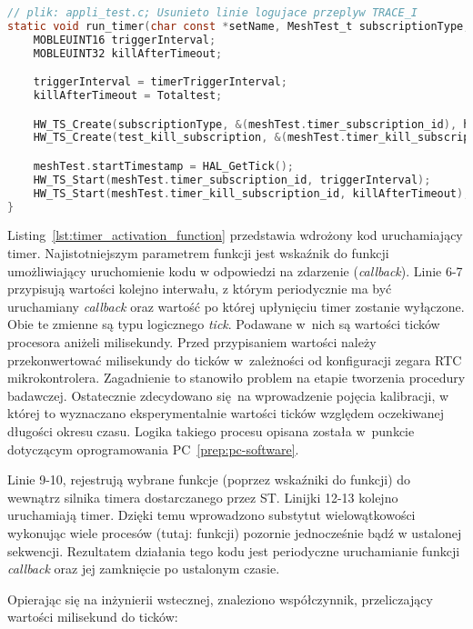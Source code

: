 \begin{lstlisting}[language=C,
    caption={Funkcja aktywująca timer},
    label={lst:timer_activation_function}]
// plik: appli_test.c; Usunieto linie logujace przeplyw TRACE_I
static void run_timer(char const *setName, MeshTest_t subscriptionType, MOBLE_ADDRESS src ,MOBLE_ADDRESS dst, void (*callback)(void) ) {
	MOBLEUINT16 triggerInterval;
	MOBLEUINT32 killAfterTimeout;

	triggerInterval = timerTriggerInterval;
	killAfterTimeout = Totaltest;

	HW_TS_Create(subscriptionType, &(meshTest.timer_subscription_id), hw_ts_Repeated, callback);
	HW_TS_Create(test_kill_subscription, &(meshTest.timer_kill_subscription_id), hw_ts_SingleShot, kill_subscription);

	meshTest.startTimestamp = HAL_GetTick();
	HW_TS_Start(meshTest.timer_subscription_id, triggerInterval);
	HW_TS_Start(meshTest.timer_kill_subscription_id, killAfterTimeout);
}
\end{lstlisting}

Listing~\ref{lst:timer_activation_function} przedstawia wdrożony kod uruchamiający timer. Najistotniejszym parametrem funkcji jest
wskaźnik do funkcji umożliwiający uruchomienie kodu w odpowiedzi na zdarzenie (\textit{callback}). Linie 6-7 przypisują
wartości kolejno interwału, z którym periodycznie ma być uruchamiany \textit{callback} oraz wartość po której upłynięciu
timer zostanie wyłączone. Obie te zmienne są typu logicznego \textit{tick}. Podawane w~nich są wartości ticków procesora aniżeli
milisekundy. Przed przypisaniem wartości należy przekonwertować milisekundy do ticków w~zależności od konfiguracji
zegara RTC mikrokontrolera. Zagadnienie to stanowiło problem na etapie tworzenia procedury badawczej. Ostatecznie zdecydowano
się na wprowadzenie pojęcia kalibracji, w której to wyznaczano eksperymentalnie wartości ticków względem oczekiwanej długości
okresu czasu. Logika takiego procesu opisana została w~punkcie dotyczącym oprogramowania PC~\ref{prep:pc-software}.

Linie 9-10, rejestrują wybrane funkcje (poprzez wskaźniki do funkcji) do wewnątrz silnika timera dostarczanego przez ST.
Linijki 12-13 kolejno uruchamiają timer. Dzięki temu wprowadzono substytut wielowątkowości wykonując wiele procesów (tutaj: funkcji)
pozornie jednocześnie bądź w ustalonej sekwencji. Rezultatem działania tego kodu jest periodyczne uruchamianie
funkcji \textit{callback} oraz jej zamknięcie po ustalonym czasie.

Opierając się na inżynierii wstecznej, znaleziono współczynnik, przeliczający wartości milisekund do ticków:

